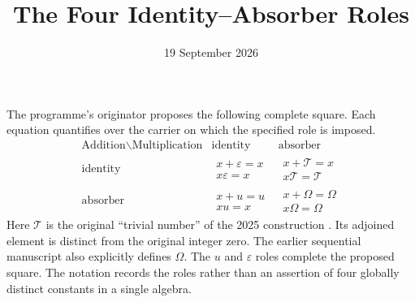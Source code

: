 \documentclass[11pt]{article}
\title{The Four Identity--Absorber Roles}
\author{}
\date{19 September 2026}
\begin{document}
\maketitle

The programme's originator proposes the following complete square. Each equation quantifies over the carrier on which the specified role is imposed.
\[
\begin{array}{c|c|c}
\text{Addition}\backslash\text{Multiplication}&\text{identity}&\text{absorber}\\\hline
\text{identity}&
\begin{gathered}x+\varepsilon=x\\x\varepsilon=x\end{gathered}&
\begin{gathered}x+\mathcal T=x\\x\mathcal T=\mathcal T\end{gathered}\\\hline
\text{absorber}&
\begin{gathered}x+u=u\\xu=x\end{gathered}&
\begin{gathered}x+\Omega=\Omega\\x\Omega=\Omega\end{gathered}
\end{array}
\]
Here $\mathcal T$ is the original ``trivial number'' of the 2025 construction \cite{origin}. Its adjoined element is distinct from the original integer zero. The earlier sequential manuscript \cite{sequential} also explicitly defines $\Omega$. The $u$ and $\varepsilon$ roles complete the proposed square. The notation records the roles rather than an assertion of four globally distinct constants in a single algebra.
\end{document}
